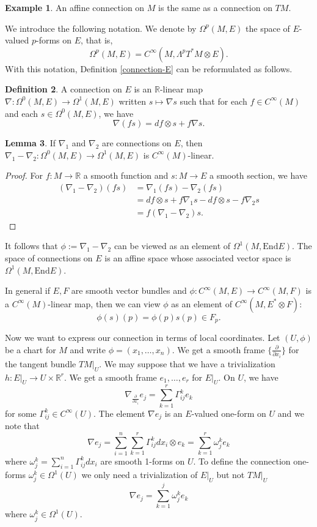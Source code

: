 \documentclass{amsart}
\numberwithin{equation}{section}
\newcommand{\bR}{\mathbb{R}}
\theoremstyle{definition}
\newtheorem{definition}{Definition} [section]
\newtheorem{example}[definition]{Example}
\theoremstyle{theorem}
\newtheorem{lemma}[definition]{Lemma}
\begin{document}
\begin{example}
An affine connection on $M$ is the same as a connection on $TM$. 
\end{example}

We introduce the following notation. We denote by $\Omega^p(M,E)$ the space of $E$-valued $p$-forms on $E$, that is, 
\[
\Omega^p(M,E) = C^\infty(M, \Lambda^p T^*M \otimes E).
\]
With this notation, Definition \ref{connection-E} can be reformulated as follows.
\begin{definition}
A connection on $E$ is an $\bR$-linear map $\nabla : \Omega^0(M,E) \to \Omega^1(M,E)$ 
written $s \mapsto \nabla s$ such that for each $f \in C^{\infty}(M)$ and each $s \in \Omega^0(M,E)$, we have 
\[
\nabla(fs) = df \otimes s + f \nabla s.
\]
\end{definition}

\begin{lemma}
If $\nabla_1$ and $\nabla_2$ are connections on $E$, then $\nabla_1 - \nabla_2 :\Omega^0(M, E) \to \Omega^{1}(M,E)$ is 
$C^{\infty}(M)$-linear. 
\end{lemma}

\begin{proof}
For $f : M \to \mathbb{R}$ a smooth function and $s : M \to E$ a smooth section, we have 
\begin{align*}
(\nabla_1 - \nabla_2)(fs) &= \nabla_1(fs) - \nabla_2(fs) \\
&= df \otimes s + f \nabla_1 s - df \otimes s - f \nabla_2s \\
&= f (\nabla_1 - \nabla_2)s.
\end{align*}
\end{proof}

It follows that $\phi := \nabla_1 - \nabla_2$ can be viewed as an element of $\Omega^1(M, \text{End} E)$. 
The space of connections on $E$ is an affine space whose associated vector space is $\Omega^1(M, \text{End}E)$. 

In general if $E,F$ are smooth vector bundles and $\phi : C^\infty(M, E) \to C^{\infty}(M,F)$ is a $C^\infty(M)$-linear map, then we can view $\phi$ as an element of $C^\infty(M, E^* \otimes F)$:
\[
\phi(s)(p) = \phi(p)s(p) \in F_p.
\]

Now we want to express our connection in terms of local coordinates. Let $(U,\phi)$ be a chart for $M$ and write $\phi = (x_1, \ldots, x_n)$. We get a smooth frame $\{\frac{\partial}{\partial x_i}\}$ for the tangent bundle $TM|_U$. We may suppose that we have a trivialization $h : E|_U \to U \times \mathbb{R}^r$. We get a smooth frame $e_1, \ldots, e_r$ for $E|_U$. On $U$, we have
\[
\nabla_{\frac{\partial}{\partial x_i}} e_j = \sum_{k=1}^r \Gamma_{ij}^k e_k
\]
for some $\Gamma_{ij}^k\in C^\infty(U)$. The element $\nabla e_j$ is an $E$-valued one-form on $U$ and we note that 
$$
\nabla e_j =  \sum_{i=1}^n \sum_{k=1}^r \Gamma_{ij}^k dx_i \otimes e_k = \sum_{k=1}^r \omega_j^k e_k
$$
where $\omega_j^k = \sum_{i=1}^n \Gamma_{ij}^k dx_i$ are smooth 1-forms on $U$. To define the connection one-forms 
$\omega_j^k \in \Omega^1(U)$ we only 
need a trivialization of $E|_U$ but not $TM|_U$ 
$$
\nabla e_j =\sum_{k=1}^j \omega_j^k e_k
$$
where $\omega_j^k\in \Omega^1(U)$. 
\end{document}
